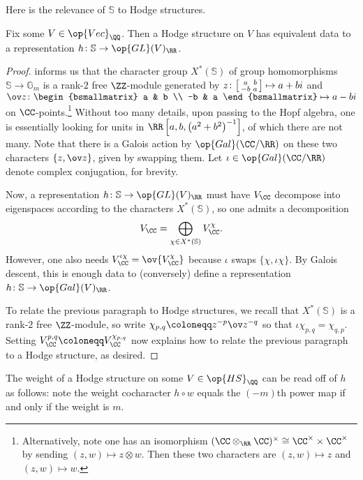 \documentclass[../thesis.tex]{subfiles}
\begin{document}
Here is the relevance of $\mathbb S$ to Hodge structures.
\begin{lemma} \label{lem:hodge-by-s}
	Fix some $V\in\op{Vec}_\QQ$. Then a Hodge structure on $V$ has equivalent data to a representation $h\colon\mathbb S\to\op{GL}(V)_\RR$.
\end{lemma}
\begin{proof}
	 informs us that the character group $X^*(\mathbb S)$ of group homomorphisms $\mathbb S\to\mathbb G_m$ is a rank-$2$ free $\ZZ$-module generated by $z\colon\begin{bsmallmatrix}
		a & b \\ -b & a
	\end{bsmallmatrix}\mapsto a+bi$ and $\ov z\colon\begin{bsmallmatrix}
		a & b \\ -b & a
	\end{bsmallmatrix}\mapsto a-bi$ on $\CC$-points.\footnote{Alternatively, note one has an isomorphism $(\CC\otimes_\RR\CC)^\times\cong\CC^\times\times\CC^\times$ by sending $(z,w)\mapsto z\otimes w$. Then these two characters are $(z,w)\mapsto z$ and $(z,w)\mapsto w$.} Without too many details, upon passing to the Hopf algebra, one is essentially looking for units in $\RR\left[a,b,\left(a^2+b^2\right)^{-1}\right]$, of which there are not many. Note that there is a Galois action by $\op{Gal}(\CC/\RR)$ on these two characters $\{z,\ov z\}$, given by swapping them. Let $\iota\in\op{Gal}(\CC/\RR)$ denote complex conjugation, for brevity.

	Now, a representation $h\colon\mathbb S\to\op{GL}(V)_\RR$ must have $V_\CC$ decompose into eigenspaces according to the characters $X^*(\mathbb S)$, so one admits a decomposition
	\[V_\CC=\bigoplus_{\chi\in X^*(\mathbb S)}V_\CC^\chi.\]
	However, one also needs $V_\CC^{\iota\chi}=\ov{V_\CC^\chi}$ because $\iota$ swaps $\{\chi,\iota\chi\}$. By Galois descent, this is enough data to (conversely) define a representation $h\colon\mathbb S\to\op{Gal}(V)_\RR$.

	To relate the previous paragraph to Hodge structures, we recall that $X^*(\mathbb S)$ is a rank-$2$ free $\ZZ$-module, so write $\chi_{p,q}\coloneqq z^{-p}\ov z^{-q}$ so that $\iota\chi_{p,q}=\chi_{q,p}$. Setting $V_\CC^{p,q}\coloneqq V_\CC^{\chi_{p,q}}$ now explains how to relate the previous paragraph to a Hodge structure, as desired.
\end{proof}
\begin{remark}
	The weight of a Hodge structure on some $V\in\op{HS}_\QQ$ can be read off of $h$ as follows: note the weight cocharacter $h\circ w$ equals the $(-m)$th power map if and only if the weight is $m$. 
\end{remark}
\end{document}
